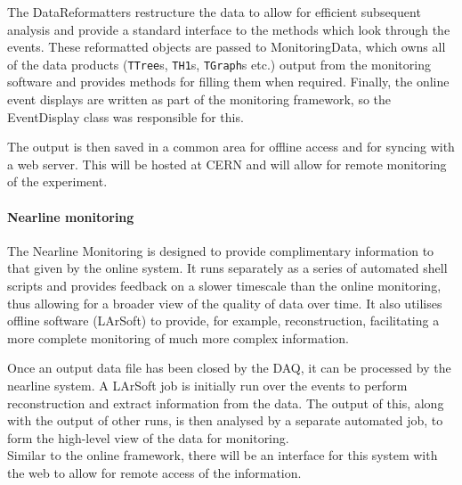 
The DataReformatters restructure the data to allow for efficient subsequent
analysis and provide a standard interface to the methods which look through
the events.  These reformatted objects are passed to MonitoringData, which
owns all of the data products (\texttt{TTree}s, \texttt{TH1}s, \texttt{TGraph}s
etc.) output from the monitoring software and provides methods for filling
them when required.  Finally, the online event displays are
written as part of the monitoring framework, so the EventDisplay class was
responsible for this.  

The output is then saved in a common area for offline access and for syncing
with a web server. This will be hosted at CERN and will allow for remote
monitoring of the experiment.

\paragraph{Nearline monitoring}

The Nearline Monitoring is designed to provide complimentary information to
that given by the online system. It runs separately as a series of automated
shell scripts and provides feedback on a slower timescale than the online
monitoring, thus allowing for a broader view of the quality of data over time.
It also utilises offline software (LArSoft) to provide, for example,
reconstruction, facilitating a more complete monitoring of much more complex
information.

Once an output data file has been closed by the DAQ, it can be processed by the
nearline system.  A LArSoft job is initially run over the events to perform
reconstruction and extract information from the data.  The output of this,
along with the output of other runs, is then analysed by a separate automated
job, to form the high-level view of the data for monitoring.\\
%
Similar to the online framework, there will be an interface for this system
with the web to allow for remote access of the information.


